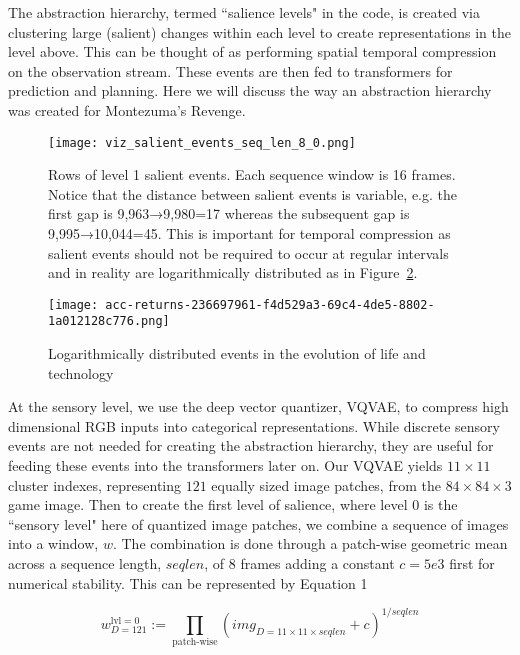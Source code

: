 \documentclass{article}
\begin{document}
The abstraction hierarchy, termed \textquotedblleft salience levels" in the code, is created via clustering large (salient) changes within each level to create representations in the level above. This can be thought of as performing spatial temporal compression on the observation stream. These events are then fed to transformers for prediction and planning. Here we will discuss the way an abstraction hierarchy was created for Montezuma's Revenge.

\begin{figure}[!htp]
    \centering
    \texttt{[image: viz\_salient\_events\_seq\_len\_8\_0.png]}
    \caption{Rows of level 1 salient events. Each sequence window is 16 frames. Notice that the distance between salient events is variable, e.g. the first gap is 9,963→9,980=17 whereas the subsequent gap is 9,995→10,044=45. This is important for temporal compression as salient events should not be required to occur at regular intervals and in reality \cite{kurzweil1999age} are logarithmically distributed as in Figure~\ref{fig:acc-returns}.
    }
    \label{fig:level-1-salient}
\end{figure}
\begin{figure}
    \centering
    \texttt{[image: acc-returns-236697961-f4d529a3-69c4-4de5-8802-1a012128c776.png]}
    \caption{ Logarithmically distributed events in the evolution of life and technology \cite{kurzweil1999age}}
    \label{fig:acc-returns}
\end{figure}
At the sensory level, we use the deep vector quantizer, VQVAE, to compress high dimensional RGB inputs into categorical representations. While discrete sensory events are not needed for creating the abstraction hierarchy, they are useful for feeding these events into the transformers later on. Our VQVAE yields $11 \times 11$ cluster indexes, representing $121$ equally sized image patches, from the $84 \times 84 \times 3$ game image. Then to create the first level of salience, where level $0$ is the \textquotedblleft sensory level" here of quantized image patches, we combine a sequence of images into a window, $w$. The combination is done through a patch-wise geometric mean across a sequence length, $seqlen$, of 8 frames adding a constant $c=5e3$ first for numerical stability. This can be represented by
Equation 1

\[
    w_{D=121}^{\text{lvl}=0} :=
    \prod_{\text{patch-wise}} \left(
        img_{D=11 \times 11\times seqlen} + c
    \right) ^ {1/seqlen}
\]
\end{document}
